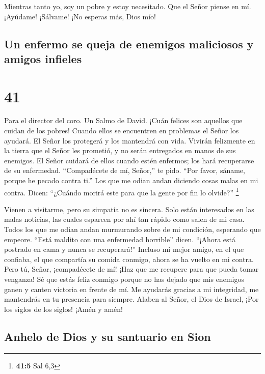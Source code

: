  Mientras tanto yo, soy un pobre y estoy necesitado. Que el
Señor piense en mí. ¡Ayúdame! ¡Sálvame! ¡No esperas más, Dios mío!

\hypertarget{un-enfermo-se-queja-de-enemigos-maliciosos-y-amigos-infieles}{%
\subsection{Un enfermo se queja de enemigos maliciosos y amigos
infieles}\label{un-enfermo-se-queja-de-enemigos-maliciosos-y-amigos-infieles}}

\hypertarget{section-40}{%
\section{41}\label{section-40}}

Para el director del coro. Un Salmo de David.  ¡Cuán felices
son aquellos que cuidan de los pobres! Cuando ellos se encuentren en
problemas el Señor los ayudará.  El Señor los protegerá y
los mantendrá con vida. Vivirán felizmente en la tierra que el Señor les
prometió, y no serán entregados en manos de sus enemigos. 
El Señor cuidará de ellos cuando estén enfermos; los hará recuperarse de
su enfermedad.  ``Compadécete de mí, Señor,'' te pido. ``Por
favor, sáname, porque he pecado contra ti.''  Los que me
odian andan diciendo cosas malas en mi contra. Dicen: ``¿Cuándo morirá
este para que la gente por fin lo olvide?'' \footnote{\textbf{41:5} Sal
  6,3}

 Vienen a visitarme, pero su simpatía no es sincera. Solo
están interesados en las malas noticias, las cuales esparcen por ahí tan
rápido como salen de mi casa.  Todos los que me odian andan
murmurando sobre de mi condición, esperando que empeore. 
``Está maldito con una enfermedad horrible'' dicen. ``¡Ahora está
postrado en cama y nunca se recuperará!''  Incluso mi mejor
amigo, en el que confiaba, el que compartía su comida conmigo, ahora se
ha vuelto en mi contra.  Pero tú, Señor, ¡compadécete de
mí! ¡Haz que me recupere para que pueda tomar venganza!  Sé
que estás feliz conmigo porque no has dejado que mis enemigos ganen y
canten victoria en frente de mí.  Me ayudarás gracias a mi
integridad, me mantendrás en tu presencia para siempre. 
Alaben al Señor, el Dios de Israel, ¡Por los siglos de los siglos! ¡Amén
y amén!

\hypertarget{anhelo-de-dios-y-su-santuario-en-sion}{%
\subsection{Anhelo de Dios y su santuario en
Sion}\label{anhelo-de-dios-y-su-santuario-en-sion}}

